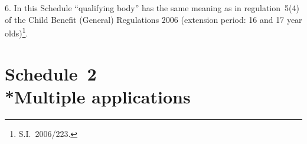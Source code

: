 \documentclass[12pt,a4paper]{article}
\begin{document}
%
%
%
%
%
%

6.  In this Schedule “qualifying body” has the same meaning as in regulation~5(4) of the Child Benefit (General) Regulations 2006 (extension period: 16 and 17 year olds)\footnote{S.I.~2006/223.}.


\part[Schedule~2 --- Multiple applications]{Schedule~2\\*Multiple applications}
\end{document}
